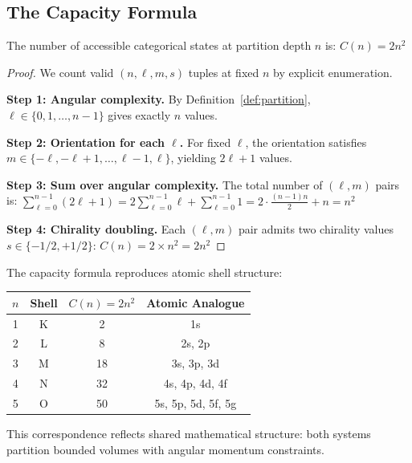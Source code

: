 \subsection{The Capacity Formula}

\begin{theorem}
\label{thm:capacity}
The number of accessible categorical states at partition depth $n$ is:
$
C(n) = 2n^2
$
\end{theorem}

\begin{proof}
We count valid $(n, \ell, m, s)$ tuples at fixed $n$ by explicit enumeration.

\textbf{Step 1: Angular complexity.} By Definition~\ref{def:partition}, $\ell \in \{0, 1, \ldots, n-1\}$ gives exactly $n$ values.

\textbf{Step 2: Orientation for each $\ell$.} For fixed $\ell$, the orientation satisfies $m \in \{-\ell, -\ell+1, \ldots, \ell-1, \ell\}$, yielding $2\ell + 1$ values.

\textbf{Step 3: Sum over angular complexity.} The total number of $(\ell, m)$ pairs is:
$
\sum_{\ell=0}^{n-1} (2\ell + 1) = 2\sum_{\ell=0}^{n-1} \ell + \sum_{\ell=0}^{n-1} 1 = 2 \cdot \frac{(n-1)n}{2} + n = n^2
$

\textbf{Step 4: Chirality doubling.} Each $(\ell, m)$ pair admits two chirality values $s \in \{-1/2, +1/2\}$:
$
C(n) = 2 \times n^2 = 2n^2
$
\end{proof}

\begin{corollary}
\label{cor:shell}
The capacity formula reproduces atomic shell structure:
\begin{center}
\begin{tabular}{cccc}
\toprule
$n$ & Shell & $C(n) = 2n^2$ & Atomic Analogue \\
\midrule
1 & K & 2 & 1s \\
2 & L & 8 & 2s, 2p \\
3 & M & 18 & 3s, 3p, 3d \\
4 & N & 32 & 4s, 4p, 4d, 4f \\
5 & O & 50 & 5s, 5p, 5d, 5f, 5g \\
\bottomrule
\end{tabular}
\end{center}
This correspondence reflects shared mathematical structure: both systems partition bounded volumes with angular momentum constraints.
\end{corollary}

